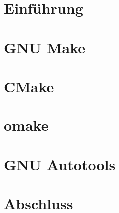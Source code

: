 \documentclass{beamer}
\begin{document}
	\section{Einführung}
	
	

	\section{GNU Make}
	\section{CMake}
	\section{omake}
	\section{GNU Autotools}

	\section{Abschluss}
	
\end{document}
